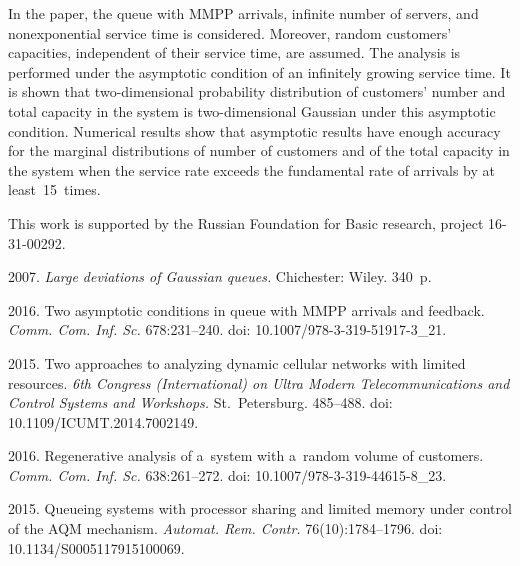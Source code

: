 \begin{multicols}{2}
\noindent
In the paper, the queue with MMPP arrivals, infinite number of servers, 
and nonexponential service time is considered. Moreover, random customers' capacities, 
independent of their service time, are assumed.
The analysis is performed under the asymptotic condition of an infinitely 
growing service time. It is shown that two-dimensional probability 
distribution of customers' number and total capacity in the system is 
two-dimensional Gaussian under this asymptotic condition. Numerical 
results show that asymptotic results have enough accuracy for 
the marginal distributions of number of customers and of the 
total capacity in the system when the service rate exceeds the 
fundamental rate of arrivals by at least~15~times.

\vspace*{-6pt}

\Ack
\noindent
This work is supported by the Russian Foundation for Basic research, project 16-31-00292.

\renewcommand{\bibname}{\protect\rmfamily References}

\vspace*{-6pt}

{\small\frenchspacing
{%
\begin{thebibliography}{99}

 2007. \textit{Large deviations of Gaussian queues.} 
Chichester: Wiley. 340~p.

 2016. 
Two asymptotic conditions in queue with MMPP arrivals and feedback. 
\textit{Comm. Com. Inf. Sc.} 678:231--240. 
doi: 10.1007/978-3-319-51917-3\_21.

 2015. 
Two approaches to analyzing dynamic cellular networks with limited resources. 
\textit{6th  Congress (International)
on Ultra Modern Telecommunications and Control Systems and Workshops.} 
St.\ Petersburg. 485--488. 
doi: 10.1109/ICUMT.2014.7002149.

 2016. 
Regenerative analysis of a~system with a~random volume of customers. 
\textit{Comm. Com. Inf. Sc.} 638:261--272. 
doi: 10.1007/978-3-319-44615-8\_23.

 2015. 
Queueing systems with processor sharing and limited memory under control of the AQM 
mechanism. \textit{Automat. Rem. Contr.} 76(10):1784--1796. 
doi: 10.1134/S0005117915100069.


\end{thebibliography}}}
\end{multicols}
